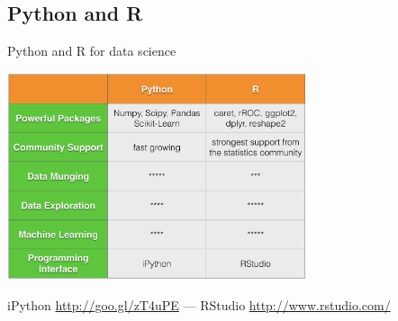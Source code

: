 \documentclass[10pt]{beamer}
\begin{document}
  \subsection{Python and R}

    \begin{frame}{Python and R for data science}
      \begin{center}
        \includegraphics[width=250pt]{graphs/python_r}
      \end{center}
      {\footnotesize
        iPython \url{http://goo.gl/zT4uPE}
        --- 
        RStudio \url{http://www.rstudio.com/}
      }
    \end{frame}

\end{document}
